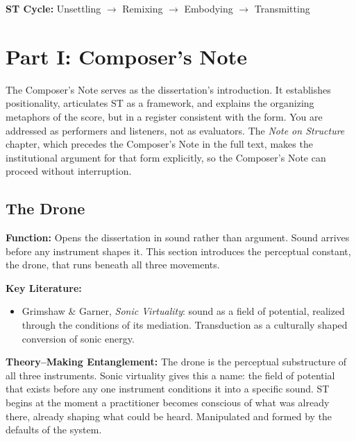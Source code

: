 \noindent\textbf{ST Cycle:} Unsettling $\to$ Remixing $\to$ Embodying $\to$ Transmitting

\bigskip


\section*{Part I: Composer's Note}

The Composer's Note serves as the dissertation's introduction. It establishes positionality, articulates ST as a framework, and explains the organizing metaphors of the score, but in a register consistent with the form. You are addressed as performers and listeners, not as evaluators. The \textit{Note on Structure} chapter, which precedes the Composer's Note in the full text, makes the institutional argument for that form explicitly, so the Composer's Note can proceed without interruption.

\medskip

\subsection*{The Drone}

\noindent\textbf{Function:} Opens the dissertation in sound rather than argument. Sound arrives before any instrument shapes it. This section introduces the perceptual constant, the drone, that runs beneath all three movements.

\noindent\textbf{Key Literature:}
\begin{itemize}[noitemsep]
    \item Grimshaw \& Garner, \textit{Sonic Virtuality}: sound as a field of potential, realized through the conditions of its mediation. Transduction as a culturally shaped conversion of sonic energy.
\end{itemize}

\noindent\textbf{Theory--Making Entanglement:} The drone is the perceptual substructure of all three instruments. Sonic virtuality gives this a name: the field of potential that exists before any one instrument conditions it into a specific sound. ST begins at the moment a practitioner becomes conscious of what was already there, already shaping what could be heard. Manipulated and formed by the defaults of the system.


